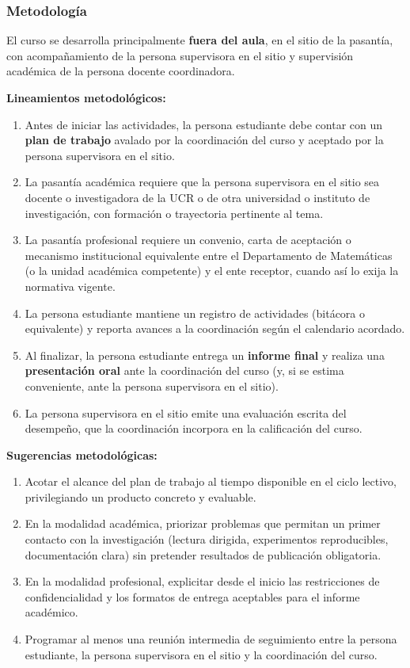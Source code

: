 \begin{refsection}
\subsubsection*{Metodología}

El curso se desarrolla principalmente \textbf{fuera del aula}, en el sitio de la pasantía, con acompañamiento de la persona supervisora en el sitio y supervisión académica de la persona docente coordinadora.

\noindent \textbf{Lineamientos metodológicos:}

\begin{enumerate}
    \item Antes de iniciar las actividades, la persona estudiante debe contar con un \textbf{plan de trabajo} avalado por la coordinación del curso y aceptado por la persona supervisora en el sitio.
    \item La pasantía académica requiere que la persona supervisora en el sitio sea docente o investigadora de la UCR o de otra universidad o instituto de investigación, con formación o trayectoria pertinente al tema.
    \item La pasantía profesional requiere un convenio, carta de aceptación o mecanismo institucional equivalente entre el Departamento de Matemáticas (o la unidad académica competente) y el ente receptor, cuando así lo exija la normativa vigente.
    \item La persona estudiante mantiene un registro de actividades (bitácora o equivalente) y reporta avances a la coordinación según el calendario acordado.
    \item Al finalizar, la persona estudiante entrega un \textbf{informe final} y realiza una \textbf{presentación oral} ante la coordinación del curso (y, si se estima conveniente, ante la persona supervisora en el sitio).
    \item La persona supervisora en el sitio emite una evaluación escrita del desempeño, que la coordinación incorpora en la calificación del curso.
\end{enumerate}

\textbf{Sugerencias metodológicas:}

\begin{enumerate}
    \item Acotar el alcance del plan de trabajo al tiempo disponible en el ciclo lectivo, privilegiando un producto concreto y evaluable.
    \item En la modalidad académica, priorizar problemas que permitan un primer contacto con la investigación (lectura dirigida, experimentos reproducibles, documentación clara) sin pretender resultados de publicación obligatoria.
    \item En la modalidad profesional, explicitar desde el inicio las restricciones de confidencialidad y los formatos de entrega aceptables para el informe académico.
    \item Programar al menos una reunión intermedia de seguimiento entre la persona estudiante, la persona supervisora en el sitio y la coordinación del curso.
\end{enumerate}


\end{refsection}
